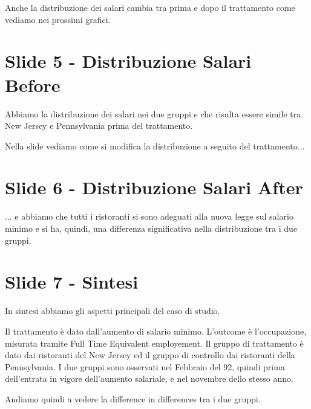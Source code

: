 \documentclass{article}
\begin{document}
Anche la distribuzione dei salari cambia tra prima e dopo il trattamento come vediamo nei prossimi grafici.

\section{Slide 5 - Distribuzione Salari Before}

Abbiamo la distribuzione dei salari nei due gruppi e che risulta essere simile tra New Jersey e Pennsylvania prima del trattamento.

Nella slide vediamo come si modifica la distribuzione a seguito del trattamento...


\section{Slide 6 - Distribuzione Salari After}

... e abbiamo che tutti i ristoranti si sono adeguati alla nuova legge sul salario minimo e si ha, quindi, una differenza significativa nella distribuzione tra i due gruppi.

\section{Slide 7 - Sintesi} 

In sintesi abbiamo gli aspetti principali del caso di studio.

Il trattamento è dato dall'aumento di salario minimo. L'outcome è l'occupazione, misurata tramite Full Time Equivalent employement. Il gruppo di trattamento è dato dai ristoranti del New Jersey ed il gruppo di controllo dai ristoranti della Pennsylvania. I due gruppi sono osservati nel Febbraio del 92, quindi prima dell'entrata in vigore dell'aumento salariale, e nel novembre dello stesso anno.

Andiamo quindi a vedere la difference in differences tra i due gruppi.
\end{document}
